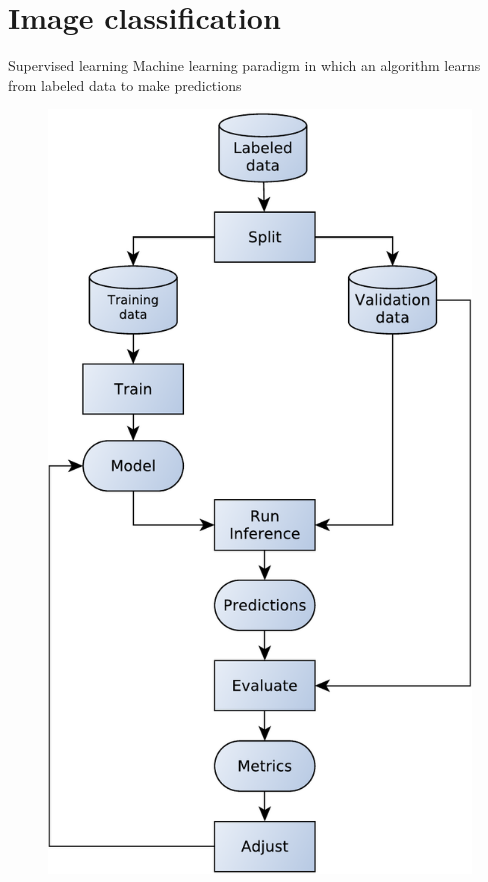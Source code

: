 
\section{Image classification}

\begin{frame}{Supervised learning}
Machine learning paradigm in which an algorithm learns from labeled data to
make predictions
  \begin{figure}
	\includegraphics[width=\linewidth,height=0.75\textheight,keepaspectratio]{images/supervised_learning.pdf}
  \end{figure}
\end{frame}

